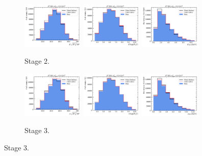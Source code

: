 \begin{figure}[htb]
    \begin{subfigure}{\textwidth}
        \centering
        \includegraphics[width=0.32\textwidth]{./figs-mc-correction/reweighting-final/plot_step2-D0_iso-k_comp.pdf}
        \includegraphics[width=0.32\textwidth]{./figs-mc-correction/reweighting-final/plot_step2-D0_iso-k_log_ip_chi2.pdf}
        \includegraphics[width=0.32\textwidth]{./figs-mc-correction/reweighting-final/plot_step2-D0_iso-k_pt.pdf}
        \caption{Stage 2.}
    \end{subfigure}

    \begin{subfigure}{\textwidth}
        \centering
        \includegraphics[width=0.32\textwidth]{./figs-mc-correction/reweighting-final/plot_step3-D0_iso-pi_comp.pdf}
        \includegraphics[width=0.32\textwidth]{./figs-mc-correction/reweighting-final/plot_step3-D0_iso-pi_log_ip_chi2.pdf}
        \includegraphics[width=0.32\textwidth]{./figs-mc-correction/reweighting-final/plot_step3-D0_iso-pi_pt.pdf}
        \caption{Stage 3.}
    \end{subfigure}


\end{figure}
